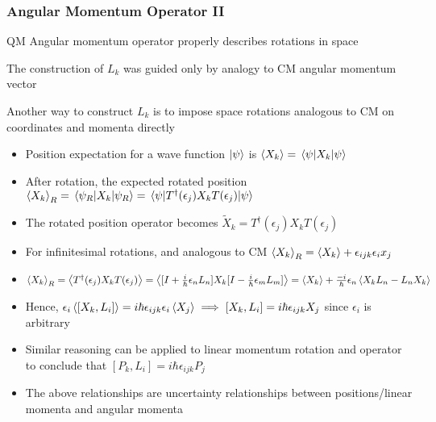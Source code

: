 \documentclass[8pt,t,mathserif,aspectratio=169]{beamer}
\begin{document}
\begin{frame}
  \frametitle{Angular Momentum Operator II}
  \vspace{1mm}
  QM Angular momentum operator properly describes rotations in space

  The construction of $L_k$ was guided only by analogy to CM angular momentum vector

  Another way to construct $L_k$ is to impose space rotations analogous to CM on coordinates and momenta directly
    \begin{itemize}
    \item Position expectation for a wave function $\ket{\psi}$ is $\expval{X_k} = \expval{X_k}{\psi}$
    \item After rotation, the expected rotated position $\expval{X_k}_{R} = \expval{X_k}{\psi_{R}} = \expval{T^{\dagger}(\epsilon_j) X_k T(\epsilon_j)}{\psi}$
    \item The rotated position operator becomes $\tilde{X}_{k} = T^{\dagger}(\epsilon_j) X_k T(\epsilon_j)$
    \item For infinitesimal rotations, and analogous to CM $\expval{X_k}_{R} = \expval{X_k} + \epsilon_{ijk} \epsilon_{i} x_{j}$
    \item $\expval{X_k}_{R} = \expval{T^{\dagger}(\epsilon_j) X_k T(\epsilon_j)} = \expval{[I + {i \over \hbar} \epsilon_n L_n] X_k [I - {i \over \hbar} \epsilon_m L_m]}  = \expval{X_k} + {-i \over \hbar} \epsilon_n \expval{X_k L_n - L_n X_k}$
    \item Hence, $\epsilon_i \expval{[X_k,L_i]} = i \hbar \epsilon_{ijk} \epsilon_{i} \expval{X_{j}} \implies [X_k,L_i] = i \hbar \epsilon_{ijk} X_{j}$ since $\epsilon_{i}$ is arbitrary
    \item Similar reasoning can be applied to linear momentum rotation and operator to conclude that $[P_k,L_i] = i \hbar \epsilon_{ijk} P_{j}$
    \item The above relationships are uncertainty relationships between positions/linear momenta and angular momenta
  \end{itemize}
\end{frame}
\end{document}
